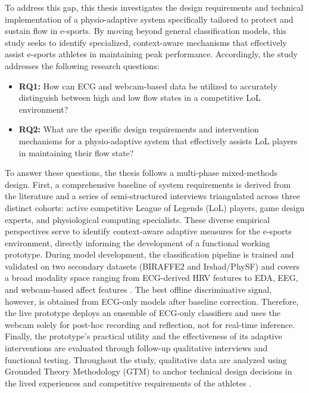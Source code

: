 To address this gap, this thesis investigates the design requirements and technical implementation of a physio-adaptive system specifically tailored to protect and sustain flow in e-sports. By moving beyond general classification models, this study seeks to identify specialized, context-aware mechanisms that effectively assist e-sports athletes in maintaining peak performance. Accordingly, the study addresses the following research questions:

\begin{itemize}
    \item \textbf{RQ1:} How can ECG and webcam-based data be utilized to accurately distinguish between high and low flow states in a competitive LoL environment? \label{rq:classification}
    \item \textbf{RQ2:} What are the specific design requirements and intervention mechanisms for a physio-adaptive system that effectively assists LoL players in maintaining their flow state? \label{rq:adaptation}
\end{itemize}   

To answer these questions, the thesis follows a multi-phase mixed-methods design. First, a comprehensive baseline of system requirements is derived from the literature and a series of semi-structured interviews triangulated across three distinct cohorts: active competitive League of Legends (LoL) players, game design experts, and physiological computing specialists. These diverse empirical perspectives serve to identify context-aware adaptive measures for the e-sports environment, directly informing the development of a functional working prototype. During model development, the classification pipeline is trained and validated on two secondary datasets (BIRAFFE2 and Irshad/PhySF) and covers a broad modality space ranging from ECG-derived HRV features to EDA, EEG, and webcam-based affect features \autocite{9296229,irshad2023wearable,kutt2022biraffe2}. The best offline discriminative signal, however, is obtained from ECG-only models after baseline correction. Therefore, the live prototype deploys an ensemble of ECG-only classifiers and uses the webcam solely for post-hoc recording and reflection, not for real-time inference. Finally, the prototype’s practical utility and the effectiveness of its adaptive interventions are evaluated through follow-up qualitative interviews and functional testing. Throughout the study, qualitative data are analyzed using Grounded Theory Methodology (GTM) \autocite{recker2021researchmethods} to anchor technical design decisions in the lived experiences and competitive requirements of the athletes \autocite{delveholempaecher2024openaxialselective}.